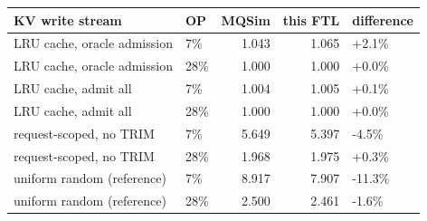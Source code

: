 \begin{tabular}{llrrl}
\toprule
KV write stream & OP & MQSim & this FTL & difference \\
\midrule
LRU cache, oracle admission & 7\% & 1.043 & 1.065 & +2.1\% \\
LRU cache, oracle admission & 28\% & 1.000 & 1.000 & +0.0\% \\
LRU cache, admit all & 7\% & 1.004 & 1.005 & +0.1\% \\
LRU cache, admit all & 28\% & 1.000 & 1.000 & +0.0\% \\
request-scoped, no TRIM & 7\% & 5.649 & 5.397 & -4.5\% \\
request-scoped, no TRIM & 28\% & 1.968 & 1.975 & +0.3\% \\
uniform random (reference) & 7\% & 8.917 & 7.907 & -11.3\% \\
uniform random (reference) & 28\% & 2.500 & 2.461 & -1.6\% \\
\bottomrule
\end{tabular}
